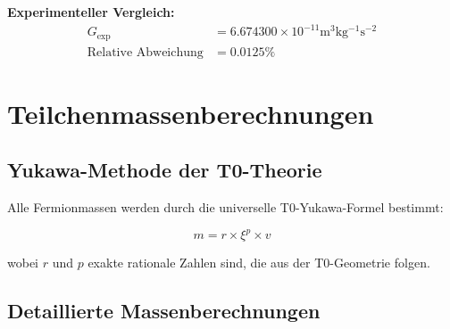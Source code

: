 \documentclass[12pt,a4paper]{report}
\begin{document}
	\textbf{Experimenteller Vergleich:}
	\begin{align}
		G_{\text{exp}} &= 6.674300 \times 10^{-11} \si{\meter^3 \kilogram^{-1} \second^{-2}} \\
		\text{Relative Abweichung} &= 0.0125\%
	\end{align}
	
	\section{Teilchenmassenberechnungen}
	
	\subsection{Yukawa-Methode der T0-Theorie}
	
	Alle Fermionmassen werden durch die universelle T0-Yukawa-Formel bestimmt:
	
	\begin{equation}
		\boxed{m = r \times \xi^p \times v}
	\end{equation}
	
	wobei $r$ und $p$ exakte rationale Zahlen sind, die aus der T0-Geometrie folgen.
	
	\subsection{Detaillierte Massenberechnungen}
	
\end{document}
